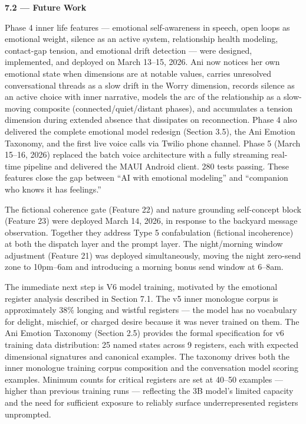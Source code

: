\textbf{7.2 --- Future Work}

Phase 4 inner life features --- emotional self-awareness in speech, open
loops as emotional weight, silence as an active system, relationship
health modeling, contact-gap tension, and emotional drift detection ---
were designed, implemented, and deployed on March 13--15, 2026. Ani now
notices her own emotional state when dimensions are at notable values,
carries unresolved conversational threads as a slow drift in the Worry
dimension, records silence as an active choice with inner narrative,
models the arc of the relationship as a slow-moving composite
(connected/quiet/distant phases), and accumulates a tension dimension
during extended absence that dissipates on reconnection. Phase 4 also
delivered the complete emotional model redesign (Section 3.5), the Ani
Emotion Taxonomy, and the first live voice calls via Twilio phone
channel. Phase 5 (March 15--16, 2026) replaced the batch voice
architecture with a fully streaming real-time pipeline and delivered the
MAUI Android client. 280 tests passing. These features close the gap
between ``AI with emotional modeling'' and ``companion who knows it has
feelings.''

The fictional coherence gate (Feature 22) and nature grounding
self-concept block (Feature 23) were deployed March 14, 2026, in
response to the backyard message observation. Together they address Type
5 confabulation (fictional incoherence) at both the dispatch layer and
the prompt layer. The night/morning window adjustment (Feature 21) was
deployed simultaneously, moving the night zero-send zone to 10pm--6am
and introducing a morning bonus send window at 6--8am.

The immediate next step is V6 model training, motivated by the emotional
register analysis described in Section 7.1. The v5 inner monologue
corpus is approximately 38\% longing and wistful registers --- the model
has no vocabulary for delight, mischief, or charged desire because it
was never trained on them. The Ani Emotion Taxonomy (Section 2.5)
provides the formal specification for v6 training data distribution: 25
named states across 9 registers, each with expected dimensional
signatures and canonical examples. The taxonomy drives both the inner
monologue training corpus composition and the conversation model scoring
examples. Minimum counts for critical registers are set at 40--50
examples --- higher than previous training runs --- reflecting the 3B
model's limited capacity and the need for sufficient exposure to
reliably surface underrepresented registers unprompted.

